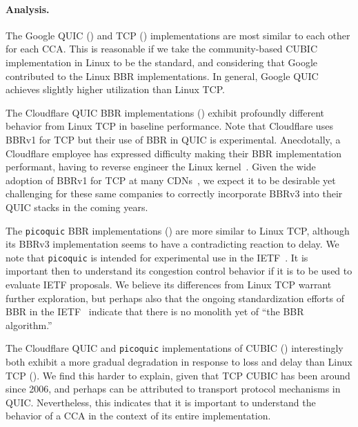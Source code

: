 \paragraph{Analysis.}

The Google QUIC ()
and TCP ()
implementations are most similar to each other for each CCA.
This is reasonable if we take the community-based CUBIC implementation in
Linux to be the standard, and considering that Google contributed to the Linux
BBR implementations. In general, Google QUIC achieves slightly higher
utilization than Linux TCP.

The Cloudflare QUIC BBR implementations ()
exhibit profoundly different behavior from Linux TCP in baseline performance.
Note that Cloudflare uses BBRv1 for TCP but their use of BBR in QUIC
is experimental. Anecdotally, a
Cloudflare employee has expressed difficulty making
their BBR implementation performant, having to reverse engineer
the Linux kernel~\cite{cardwell2024bbrv3-ietf119-qna}. Given the wide adoption
of BBRv1 for TCP at many CDNs~\cite{ware2024ccanalyzer}, we expect it to
be desirable yet challenging for these same companies to correctly incorporate
BBRv3 into their QUIC stacks in the coming years.

The \texttt{picoquic} BBR implementations ()
are more similar to Linux TCP, although its BBRv3 implementation seems to have
a contradicting reaction to delay.
We note that \texttt{picoquic} is intended for experimental use in the
IETF~\cite{picoquic}. It is important then to understand its congestion control
behavior if it is to be used to evaluate
IETF proposals. We believe its differences from Linux TCP warrant further
exploration, but perhaps also that the ongoing standardization efforts of BBR
in the IETF~\cite{cardwell2024bbr-ietf-draft} indicate
that there is no monolith yet of ``the BBR algorithm.''

The Cloudflare QUIC and \texttt{picoquic} implementations of CUBIC
() interestingly
both exhibit a more gradual degradation in response to loss and delay than Linux TCP
(). We
find this harder to explain, given that TCP CUBIC has been around since 2006,
and perhaps can be attributed to transport protocol mechanisms in QUIC.
Nevertheless, this indicates that it is important to understand the
behavior of a CCA in the context of its entire
implementation.

